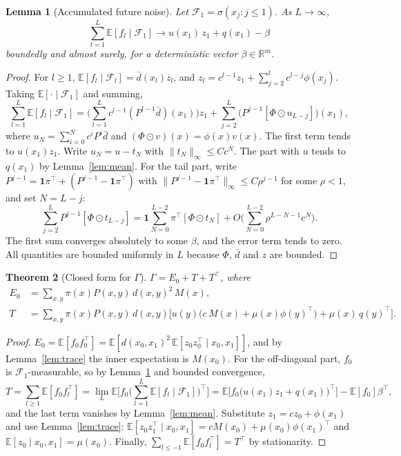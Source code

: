 \documentclass[11pt]{article}
\newtheorem{theorem}{Theorem}[section]
\newtheorem{lemma}[theorem]{Lemma}
\theoremstyle{definition}
\theoremstyle{remark}
\newcommand{\R}{\mathbb{R}}
\newcommand{\E}{\mathbb{E}}
\newcommand{\one}{\mathbf{1}}
\begin{document}
\begin{lemma}[Accumulated future noise]\label{lem:future}
Let $\mathcal F_1 = \sigma(x_j : j \le 1)$. As $L\to\infty$,
\[
  \sum_{l=1}^L\E[f_l\mid\mathcal F_1] \longrightarrow u(x_1)\,z_1 + q(x_1) - \beta
\]
boundedly and almost surely, for a deterministic vector $\beta \in \R^m$.
\end{lemma}
\begin{proof}
For $l\ge1$, $\E[f_l\mid\mathcal F_l] = \bar d(x_l)z_l$, and
$z_l = c^{l-1}z_1 + \sum_{j=2}^lc^{l-j}\phi(x_j)$. Taking $\E[\cdot\mid\mathcal F_1]$ and
summing,
\[
  \sum_{l=1}^L\E[f_l\mid\mathcal F_1]
  = \Big(\sum_{l=1}^Lc^{l-1}(P^{l-1}\bar d)(x_1)\Big)z_1
    + \sum_{j=2}^{L}\big(P^{j-1}[\Phi\odot u_{L-j}]\big)(x_1),
\]
where $u_N = \sum_{i=0}^Nc^iP^i\bar d$ and $(\Phi\odot v)(x) = \phi(x)v(x)$. The first
term tends to $u(x_1)z_1$. Write $u_N = u - t_N$ with $\|t_N\|_\infty \le Cc^N$. The part with
$u$ tends to $q(x_1)$ by Lemma~\ref{lem:mean}. For the tail part, write
$P^{j-1} = \one\pi^\top + (P^{j-1} - \one\pi^\top)$ with
$\|P^{j-1} - \one\pi^\top\|_\infty\le C\rho^{j-1}$ for some $\rho<1$, and set $N = L - j$:
\[
  \sum_{j=2}^L P^{j-1}[\Phi\odot t_{L-j}]
  = \one\sum_{N=0}^{L-2}\pi^\top[\Phi\odot t_N] + O\Big(\sum_{N=0}^{L-2}\rho^{L-N-1}c^N\Big).
\]
The first sum converges absolutely to some $\beta$, and the error term tends to zero.
All quantities are bounded uniformly in $L$ because $\Phi$, $\bar d$ and $z$ are bounded.
\end{proof}

\begin{theorem}[Closed form for $\Gamma$]\label{thm:gamma}
$\Gamma = E_0 + T + T^\top$, where
\begin{align*}
  E_0 &= \sum_{x,y}\pi(x)P(x,y)\,d(x,y)^2\,M(x), \\
  T &= \sum_{x,y}\pi(x)P(x,y)\,d(x,y)\Big[u(y)\big(c\,M(x) + \mu(x)\phi(y)^\top\big) + \mu(x)\,q(y)^\top\Big].
\end{align*}
\end{theorem}
\begin{proof}
$E_0 = \E[f_0f_0^\top] = \E[d(x_0,x_1)^2\,\E[z_0z_0^\top\mid x_0,x_1]]$, and by
Lemma~\ref{lem:trace} the inner expectation is $M(x_0)$. For the off-diagonal part,
$f_0$ is $\mathcal F_1$-measurable, so by Lemma~\ref{lem:future} and bounded
convergence,
\[
  T = \sum_{l\ge1}\E[f_0f_l^\top] = \lim_L\E\Big[f_0\Big(\sum_{l=1}^L\E[f_l\mid\mathcal F_1]\Big)^\top\Big]
  = \E\big[f_0\big(u(x_1)z_1 + q(x_1)\big)^\top\big] - \E[f_0]\beta^\top ,
\]
and the last term vanishes by Lemma~\ref{lem:mean}. Substitute
$z_1 = cz_0 + \phi(x_1)$ and use Lemma~\ref{lem:trace}:
$\E[z_0z_1^\top\mid x_0,x_1] = cM(x_0) + \mu(x_0)\phi(x_1)^\top$ and
$\E[z_0\mid x_0,x_1] = \mu(x_0)$. Finally, $\sum_{l\le -1}\E[f_0f_l^\top] = T^\top$ by
stationarity.
\end{proof}
\end{document}
